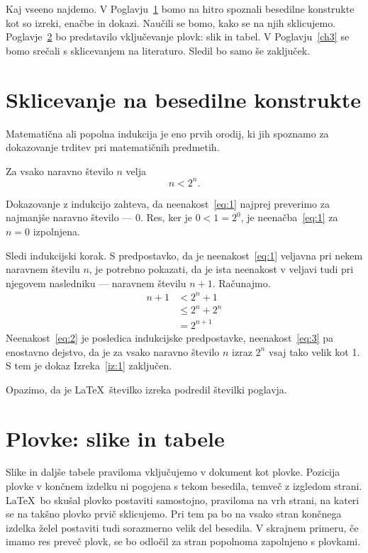 Kaj vseeno najdemo. V Poglavju~\ref{ch1} bomo na hitro spoznali besedilne konstrukte kot so izreki, enačbe in dokazi. Naučili se bomo, kako se na njih sklicujemo. Poglavje~\ref{ch2} bo predstavilo vključevanje plovk: slik in tabel. V Poglavju~\ref{ch3} se bomo srečali s sklicevanjem na literaturo.
Sledil bo samo še zaključek.

\chapter{Sklicevanje na besedilne konstrukte}
\label{ch1}
Matematična ali popolna indukcija je eno prvih orodij, ki jih spoznamo za dokazovanje trditev pri matematičnih predmetih.
\begin{izrek}
\label{iz:1}
Za vsako naravno število $n$ velja
\begin{equation}
n < 2^n.
\label{eq:1}
\end{equation}
\end{izrek}
\begin{dokaz}
Dokazovanje z indukcijo zahteva, da neenakost~\eqref{eq:1} najprej preverimo za najmanjše naravno število --- $0$. Res, ker je $0 < 1 = 2^0$, je neenačba~\eqref{eq:1} za $n=0$ izpolnjena.

Sledi indukcijski korak. S predpostavko, da je neenakost~\eqref{eq:1} veljavna pri nekem naravnem številu $n$, je potrebno pokazati, da je ista neenakost v veljavi tudi pri njegovem nasledniku --- naravnem številu $n+1$. Računajmo.
\begin{align}
n+1 &< 2^n + 1  \label{eq:2}\\
    &\le 2^n + 2^n \label{eq:3}\\
    &= 2^{n+1} \nonumber
\end{align}
Neenakost~\eqref{eq:2} je posledica indukcijske predpostavke, neenakost~\eqref{eq:3} pa enostavno dejstvo, da je za vsako naravno število $n$ izraz $2^n$ vsaj tako velik kot 1. S tem je dokaz Izreka~\ref{iz:1} zaključen.
\end{dokaz}

Opazimo, da je \LaTeX\ številko izreka podredil številki poglavja.


\chapter{Plovke: slike in tabele}
\label{ch2}
Slike in daljše tabele praviloma vključujemo v dokument kot plovke. Pozicija plovke v končnem izdelku ni pogojena s tekom besedila, temveč z izgledom strani. \LaTeX\ bo skušal plovko postaviti samostojno, praviloma na vrh strani, na kateri se na takšno plovko prvič sklicujemo. Pri tem pa bo na vsako stran končnega izdelka želel postaviti tudi sorazmerno velik del besedila. V skrajnem primeru, če imamo res preveč plovk, se bo odločil za stran popolnoma zapolnjeno s plovkami.

